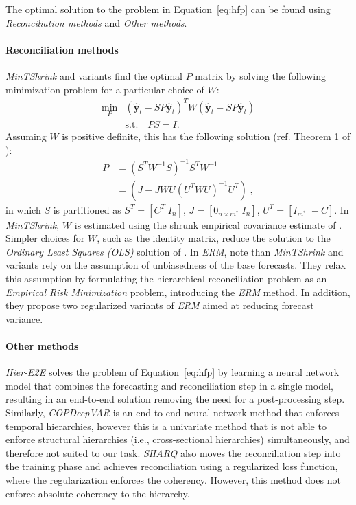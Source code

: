 \documentclass[preprint, 3p, times, twocolumn]{elsarticle}
\begin{document}
The optimal solution to the problem in Equation~\eqref{eq:hfp} can be found using \textit{Reconciliation methods} and \textit{Other methods}.

\paragraph{Reconciliation methods}

\textit{MinTShrink} \cite{wickramasuriya_optimal_2019} and variants find the optimal \(P\) matrix by solving the following minimization problem for a particular choice of \(W\):
\begin{align}
  \min_P &(\hat{\textbf{y}}_{t} - SP\hat{\textbf{y}}_{t})^T W (\hat{\textbf{y}}_{t} - SP\hat{\textbf{y}}_{t}) \nonumber \\
  & \text{s.t.} \quad PS=I. \label{eq:minp}
\end{align}
Assuming \(W\) is positive definite, this has the following solution (ref. Theorem 1 of \cite{wickramasuriya_optimal_2019}):
\begin{align} 
  P &= (S^TW^{-1}S)^{-1}S^TW^{-1} \nonumber \\
    &= (J - JWU(U^TWU)^{-1}U^T) \;, \label{eq:p1}
\end{align}
in which \(S\) is partitioned as \(S^T = [C^T \; I_n]\), \(J = [0_{n \times m^*} \; I_n]\), \(U^T = [I_{m^*} \; -C]\). In \textit{MinTShrink}, \(W\) is estimated using the shrunk empirical covariance estimate of \cite{schafer_shrinkage_2005}. Simpler choices for \(W\), such as the identity matrix, reduce the solution to the \textit{Ordinary Least Squares (OLS)} solution of \cite{hyndman_optimal_2011}. In \textit{ERM}, \citet{bentaieb_regularized_2019} note than \textit{MinTShrink} and variants rely on the assumption of unbiasedness of the base forecasts. They relax this assumption by formulating the hierarchical reconciliation problem as an \textit{Empirical Risk Minimization} problem, introducing the \textit{ERM} method. In addition, they propose two regularized variants of \textit{ERM} aimed at reducing forecast variance. 

\paragraph{Other methods} \textit{Hier-E2E} \cite{rangapuram_endtoend_2021} solves the problem of Equation~\eqref{eq:hfp} by learning a neural network model that combines the forecasting and reconciliation step in a single model, resulting in an end-to-end solution removing the need for a post-processing step. Similarly, \textit{COPDeepVAR} \cite{rangapuram_coherent_2023} is an end-to-end neural network method that enforces temporal hierarchies, however this is a univariate method that is not able to enforce structural hierarchies (i.e., cross-sectional hierarchies) simultaneously, and therefore not suited to our task. \textit{SHARQ} \cite{han_simultaneously_2021} also moves the reconciliation step into the training phase and achieves reconciliation using a regularized loss function, where the regularization enforces the coherency. However, this method does not enforce absolute coherency to the hierarchy.
\end{document}
